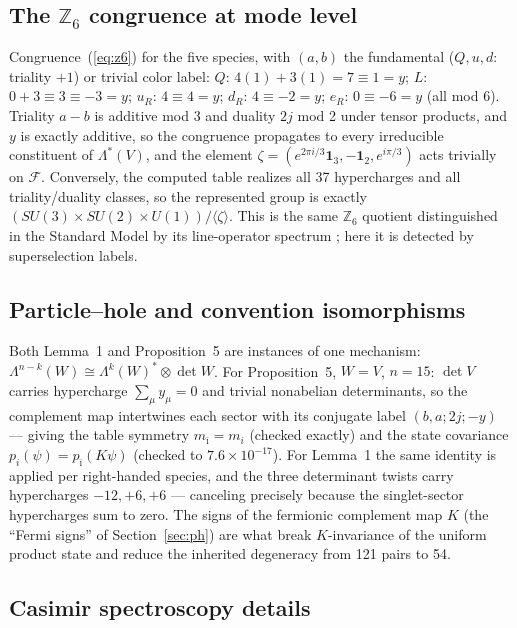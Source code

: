\documentclass[11pt]{article}
\newcommand{\ZZ}{\mathbb{Z}}
\newcommand{\Fock}{\mathcal{F}}
\begin{document}
\subsection{The \texorpdfstring{$\ZZ_6$}{Z6} congruence at mode level}\label{app:z6}

Congruence~(\ref{eq:z6}) for the five species, with $(a,b)$ the fundamental ($Q,u,d$: triality $+1$) or trivial color label: $Q$: $4(1)+3(1) = 7 \equiv 1 = y$; $L$: $0 + 3 \equiv 3 \equiv -3 = y$; $u_R$: $4 \equiv 4 = y$; $d_R$: $4 \equiv -2 = y$; $e_R$: $0 \equiv -6 = y$ (all mod 6). Triality $a-b$ is additive mod 3 and duality $2j$ mod 2 under tensor products, and $y$ is exactly additive, so the congruence propagates to every irreducible constituent of $\Lambda^*(V)$, and the element $\zeta = (e^{2\pi i/3}\mathbf{1}_3, -\mathbf{1}_2, e^{i\pi/3})$ acts trivially on $\Fock$. Conversely, the computed table realizes all 37 hypercharges and all triality/duality classes, so the represented group is exactly $(SU(3)\times SU(2)\times U(1))/\langle\zeta\rangle$. This is the same $\ZZ_6$ quotient distinguished in the Standard Model by its line-operator spectrum \cite{tong}; here it is detected by superselection labels.

\subsection{Particle--hole and convention isomorphisms}\label{app:ph}

Both Lemma~1 and Proposition~5 are instances of one mechanism: $\Lambda^{n-k}(W) \cong \Lambda^k(W)^*\otimes\det W$. For Proposition~5, $W = V$, $n = 15$: $\det V$ carries hypercharge $\sum_\mu y_\mu = 0$ and trivial nonabelian determinants, so the complement map intertwines each sector with its conjugate label $(b,a;2j;-y)$ --- giving the table symmetry $m_{\bar\imath} = m_i$ (checked exactly) and the state covariance $p_i(\psi) = p_{\bar\imath}(K\psi)$ (checked to $7.6\times10^{-17}$). For Lemma~1 the same identity is applied per right-handed species, and the three determinant twists carry hypercharges $-12, +6, +6$ --- canceling precisely because the singlet-sector hypercharges sum to zero. The signs of the fermionic complement map $K$ (the ``Fermi signs'' of Section~\ref{sec:ph}) are what break $K$-invariance of the uniform product state and reduce the inherited degeneracy from 121 pairs to 54.

\subsection{Casimir spectroscopy details}\label{app:casimir}
\end{document}
